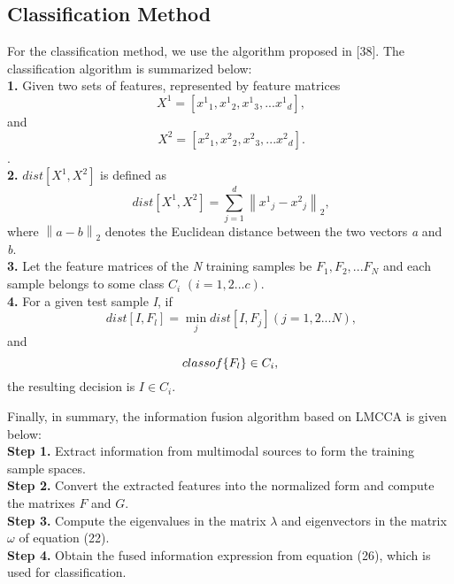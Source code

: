 \documentclass[journal]{IEEEtran}
\begin{document}
\subsection{Classification Method}
For the classification method, we use the algorithm proposed in [38]. The classification algorithm is summarized below:\\
\textbf{1.} Given two sets of features, represented by feature matrices
\begin{equation} \ {X^1} = [{x^1}_1,{x^1}_2,{x^1}_3,...{x^1}_d], \end{equation}
and
\begin{equation} \ {X^2} = [{x^2}_1,{x^2}_2,{x^2}_3,...{x^2}_d]. \end{equation}.\\
\textbf{2.} $dist[{X^1}, {X^2}]$ is defined as
\begin{equation} \ dist[{X^1}, {X^2}] = \sum\limits_{j = 1}^d {{{\left\| {{x^1}_j - {x^2}_j} \right\|}_2}}, \end{equation}
where ${\left\| {a - b} \right\|_2}$ denotes the Euclidean distance between the two vectors \emph{a} and \emph{b}. \\
\textbf{3.} Let the feature matrices of the \emph{N} training samples be ${F_1},{F_2},...{F_N}$ and each sample belongs to some class
${C_i}$ $ (i = 1,2...c )$.\\
\textbf{4.} For a given test sample \emph{I}, if
\begin{equation} \;dist[I,{F_l}] = \mathop {\min}\limits_j dist[I,{F_j}] (j = 1,2...N),\end{equation}
and
\begin{equation}
class{\rm{ }}of{\rm{ \{ }}{F_l}\}  \in {C_i}
,\end{equation}
the resulting decision is $I \in {C_i}$. \\\indent

Finally, in summary, the information fusion algorithm based on LMCCA is given below:\\
\textbf{Step 1.} Extract information from multimodal sources to form the training sample spaces.\\
\textbf{Step 2.} Convert the extracted features into the normalized form and compute the matrixes $F$ and $G$.\\
\textbf{Step 3.} Compute the eigenvalues in the matrix $\lambda$ and eigenvectors in the matrix $\omega$ of equation (22).\\
\textbf{Step 4.} Obtain the fused information expression from equation (26), which is used for classification.
\end{document}
